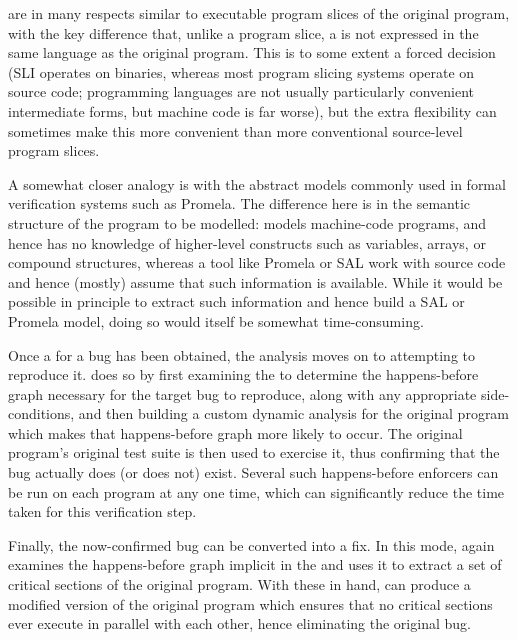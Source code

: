 \STateMachines are in many respects similar to executable program
slices of the original program, with the key difference that, unlike a
program slice, a \StateMachine is not expressed in the same language
as the original program.  This is to some extent a forced decision
(SLI operates on binaries, whereas most program slicing systems
operate on source code; programming languages are not usually
particularly convenient intermediate forms, but machine code is far
worse), but the extra flexibility can sometimes make this more
convenient than more conventional source-level program
slices.

A somewhat closer analogy is with the abstract models commonly used in
formal verification systems such as Promela\needCite{}.  The
difference here is in the semantic structure of the program to be
modelled: \technique{} models machine-code programs, and hence has no
knowledge of higher-level constructs such as variables, arrays, or
compound structures, whereas a tool like Promela or SAL\needCite{}
work with source code and hence (mostly) assume that such information
is available.  While it would be possible in principle to extract such
information and hence build a SAL or Promela model, doing so would
itself be somewhat time-consuming.

Once a \StateMachine for a bug has been obtained, the analysis moves
on to attempting to reproduce it.  \technique{} does so by first
examining the \StateMachine to determine the happens-before graph
necessary for the target bug to reproduce, along with any appropriate
side-conditions, and then building a custom dynamic analysis for the
original program which makes that happens-before graph more likely to
occur.  The original program's original test suite is then used to
exercise it, thus confirming that the bug actually does (or does not)
exist.  Several such happens-before enforcers can be run on each
program at any one time, which can significantly reduce the time taken
for this verification step.

Finally, the now-confirmed bug can be converted into a fix.  In this
mode, \technique{} again examines the happens-before graph implicit in
the \StateMachine and uses it to extract a set of critical sections of
the original program.  With these in hand, \technique{} can produce a
modified version of the original program which ensures that no
critical sections ever execute in parallel with each other, hence
eliminating the original bug.

